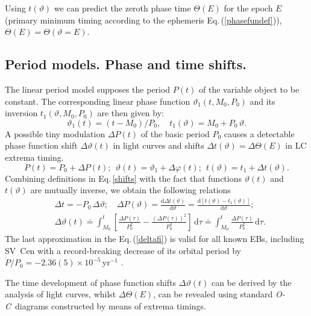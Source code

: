\documentclass{aa}
\newcommand{\oc}{\textit{O-C}}
\newcommand{\zav}[1]{\left(#1\right)}
\newcommand{\hzav}[1]{\left[#1\right]}
\begin{document}
Using $t(\vartheta)$ we can predict the zeroth phase time $\mathit{\Theta(E)}$ for the epoch $E$ (primary minimum timing according to the ephemeris Eq.\,(\ref{phasefundef})), $\mathit{\Theta(E)}=\mathit{\Theta}(\vartheta=E)$.


\subsection{Period models. Phase and time shifts.} \label{phase}

The linear period model supposes the period $P(t)$ of the variable object to be constant. The corresponding linear phase function $\vartheta_1(t,M_0,P_0)$ and its inversion $t_1(\vartheta,M_0,P_0)$ are then given by:
\begin{equation}\label{linmod}
 \vartheta_1(t)=(t-M_0)/P_0,\quad t_1(\vartheta)=M_0+P_0\,\vartheta.
\end{equation}
A possible tiny modulation $\Delta P(t)$ of the basic period $P_0$ causes a detectable phase function shift $\Delta \vartheta(t)$ in light curves and shifts $\Delta t(\vartheta)=\Delta \mathit{\Theta}(E)$ in LC extrema timing.
\begin{equation}
P(t)=P_0+ \Delta P(t);\ \ \vartheta(t)=\vartheta_1+\Delta \varphi (t);\ \
t(\vartheta)=t_1+\Delta t(\vartheta).\label{shifts}
\end{equation}
Combining definitions in Eq.\,\ref{shifts} with the fact that functions $\vartheta(t)$ and $t(\vartheta)$ are mutually inverse, we obtain the following relations
\begin{align}
&\Delta t = -P_0\,\Delta\vartheta; \quad \Delta P(\vartheta)=\frac{\mathrm d \Delta t(\vartheta)}{\mathrm d \vartheta}=\frac{\mathrm d \hzav{t(\vartheta)-t_1(\vartheta)}}{\mathrm d \vartheta};\label{relat}\\
&\Delta \vartheta(t)\doteq\int_{M_0}^t \hzav{\frac{\Delta P(\tau)}{P_0^2}
-\frac{\zav{\Delta P(\tau)}^2}{P_0^3}}\,\mathrm{d}\tau \doteq \int_{M_0}^t \frac{\Delta P(\tau)}{P_0^2}\,\mathrm{d}\tau. \label{deltafi}
\end{align}
The last approximation in the Eq.\,(\ref{deltafi}) is valid for all known EBs, including SV~Cen with a record-breaking decrease of its orbital period by $\dot{P}/P_0=-2.36(5)\times10^{-5}$\,yr$^{-1}$ \citep[][]{svicen}.

The time development of phase function shifts $\Delta \vartheta(t)$ can be derived by the analysis of light curves, whilst $\Delta \mathit {\Theta}(E)$, can be revealed using standard \oc\ diagrams constructed by means of extrema timings.
\end{document}
